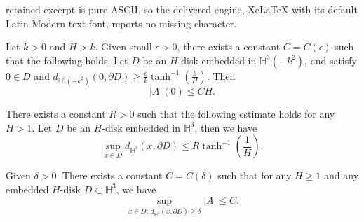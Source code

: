 \documentclass[10pt,a4paper]{amsart}
\begin{document}
retained excerpt is pure ASCII, so the delivered engine, XeLaTeX with its default Latin Modern text font, reports no missing character.
\begin{Lemma}\label{lemma_weak extrinsic}
    Let $k>0$ and $H>k$. Given small $\epsilon>0$, there exists a constant $C=C(\epsilon)$ such that the following holds. Let $D$ be an $H$-disk embedded in $\mathbb{H}^3(-k^2)$, and satisfy $0\in D$ and $d_{\mathbb{H}^3(-k^2)}(0,\partial D)\geq\frac{\epsilon}{k}\tanh^{-1}\left(\frac{k}{H}\right)$. Then \begin{equation*}
        |A|(0)\leq CH.
    \end{equation*}
\end{Lemma}

\begin{Cor}\label{cor_extrinsic radius}
   There exists a constant $R>0$ such that the following estimate holds for any $H>1$. Let $D$ be an $H$-disk embedded in $\mathbb{H}^3$, then we have \begin{equation*}
        \sup_{x\in D}d_{\mathbb{H}^3}(x,\partial D)\leq R\tanh^{-1}\left(\frac{1}{H}\right).
    \end{equation*}
\end{Cor}

\begin{Prop}\label{prop_extrinsic curv} 
Given $\delta>0$. There exists a constant $C=C(\delta)$ such that for any $H\geq 1$ and any embedded $H$-disk $D\subset\mathbb{H}^3$,
   we have \begin{equation*}
       \sup_{x\in D: \,d_{\mathbb{H}^3}(x,\partial D)\geq \delta}|A|\leq C.
   \end{equation*}
\end{Prop}
\end{document}
